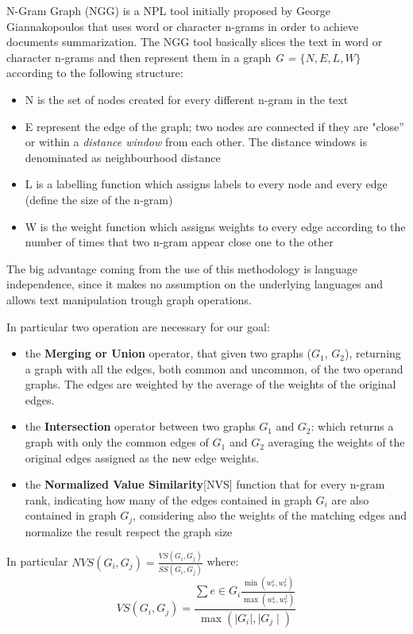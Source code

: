 N-Gram Graph (NGG) is a NPL tool initially proposed by George Giannakopoulos \cite{Ngram} that uses word or character n-grams in order to achieve documents summarization. The NGG tool basically slices the text in word or character n-grams and then represent them in a graph \emph{G = $\lbrace N,E,L,W\rbrace$} according to the following structure:
\begin{itemize}
	\item N is the set of nodes created for every different n-gram in the text
	\item E represent the edge of the graph; two nodes are connected if they are "close'' or within a \emph{distance window} from each other. The distance windows is denominated as neighbourhood distance
	\item L is a labelling function which assigns labels to every node and every edge (define the size of the n-gram)
	\item W is the weight function which assigns weights to every edge according to the number of times that two n-gram appear close one to the other
\end{itemize}

The big advantage coming from the use of this methodology is language
independence, since it makes no assumption on the underlying languages and
allows text manipulation trough graph operations.

In particular two operation are necessary for our goal:
\begin{itemize}
\item the \textbf{Merging or Union } operator, that given two graphs ($G_1$, $G_2$), returning a graph with all the edges, both common and uncommon, of the two operand graphs. The edges are weighted by the average of the weights of the original edges.
\item the \textbf{Intersection} operator between two graphs $G_1$ and $G_2$: which returns a graph with only the common edges of $G_1$ and $G_2$ averaging the weights of the original edges assigned as the new edge weights.
\item the \textbf{Normalized Value Similarity}[NVS] function that for every n-gram rank, indicating how many of the edges contained in graph $G_i$ are also contained in graph $G_j$, considering also the weights of the matching edges and normalize the result respect the graph size
\end{itemize}

In particular $NVS(G_i,G_j) = \frac{VS(G_i,G_j)}{SS(G_i,G_j)}$ where:
\begin{equation}
 VS(G_i,G_j)=\frac{\sum e \in G_i \frac{\min(w_e^i, w_e^j)}{\max(w_e^i, w_e^j)}}{\max(\mid G_i \mid, \mid G_j \mid)}
\end{equation}

